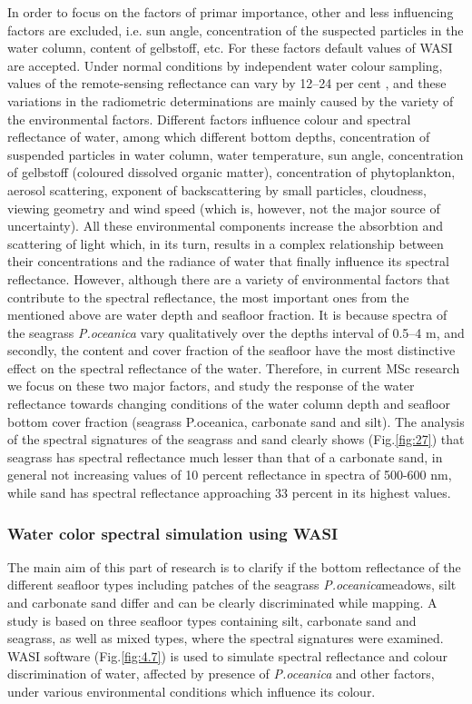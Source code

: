 \documentclass[10pt, a4paper]{article}
\begin{document}
In order to focus on the factors of primar importance, other and less influencing factors are excluded,
i.e. sun angle, concentration of the suspected particles in the water column, content of gelbstoff, etc.
For these factors default values of WASI are accepted.
Under normal conditions by independent water colour sampling, values of the remote-sensing
reflectance can vary by 12–24 per cent \cite{Toole00}\label{Toole00}, and these variations in the radiometric
determinations are mainly caused by the variety of the environmental factors.
Different factors influence colour and spectral reflectance of water, among which different bottom
depths, concentration of suspended particles in water column, water temperature, sun angle,
concentration of gelbstoff (coloured dissolved organic matter), concentration of phytoplankton,
aerosol scattering, exponent of backscattering by small particles, cloudness, viewing geometry and
wind speed (which is, however, not the major source of uncertainty). All these environmental
components increase the absorbtion and scattering of light which, in its turn, results in a complex
relationship between their concentrations and the radiance of water that finally influence its spectral
reflectance.
However, although there are a variety of environmental factors that contribute to the spectral
reflectance, the most important ones from the mentioned above are water depth and seafloor fraction.
It is because spectra of the seagrass \textit{P.oceanica} vary qualitatively over the depths interval of 0.5–4 m,
and secondly, the content and cover fraction of the seafloor have the most distinctive effect on the
spectral reflectance of the water.
Therefore, in current MSc research we focus on these two major factors, and study the response of the
water reflectance towards changing conditions of the water column depth and seafloor bottom cover
fraction (seagrass P.oceanica, carbonate sand and silt).
The analysis of the spectral signatures of the seagrass and sand clearly shows (Fig.\ref{fig:27}) that seagrass
has spectral reflectance much lesser than that of a carbonate sand, in general not increasing values of
10 percent reflectance in spectra of 500-600 nm, while sand has spectral reflectance approaching 33 percent in its
highest values.

\subsubsection{Water color spectral simulation using WASI}
The main aim of this part of research is to clarify if the bottom reflectance of the different seafloor types including patches of
the seagrass \textit{P.oceanica}meadows, silt and carbonate sand differ and can be clearly discriminated while mapping. A study is
based on three seafloor types containing silt, carbonate sand and seagrass, as well as mixed
types, where the spectral signatures were examined. WASI software (Fig.\ref{fig:4.7}) is used to simulate
spectral reflectance and colour discrimination of water, affected by presence of \textit{P.oceanica} and other factors, under various
environmental conditions which influence its colour.
\end{document}
